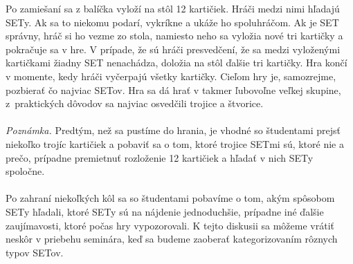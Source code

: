 \documentclass[11pt,a4paper,oneside,final]{book}
\begin{document}
Po zamiešaní sa z balíčka vyloží na stôl 12 kartičiek. Hráči medzi nimi hľadajú SETy. Ak sa to niekomu podarí, vykríkne  a ukáže ho spoluhráčom. Ak je SET správny, hráč si ho vezme zo stola, namiesto neho sa vyložia nové tri kartičky a pokračuje sa v hre. V prípade, že sú hráči presvedčení, že sa medzi vyloženými kartičkami žiadny SET nenachádza, doložia na stôl ďalšie tri kartičky. Hra končí v momente, kedy hráči vyčerpajú všetky kartičky. Cieľom hry je, samozrejme, pozbierať čo najviac SETov. Hra sa dá hrať v takmer ľubovoľne veľkej skupine, z~praktických dôvodov sa najviac osvedčili trojice a štvorice.\\
\\
\textit{Poznámka.} Predtým, než sa pustíme do hrania, je vhodné so študentami prejsť niekoľko trojíc kartičiek a pobaviť sa o tom, ktoré trojice SETmi sú, ktoré nie a prečo, prípadne premietnuť rozloženie 12 kartičiek a hľadať v nich SETy spoločne. \\
\\
Po zahraní niekoľkých kôl sa so študentami pobavíme o tom, akým spôsobom SETy hľadali, ktoré SETy sú na nájdenie jednoduchšie, prípadne iné ďalšie zaujímavosti, ktoré počas hry vypozorovali. K tejto diskusii sa môžeme vrátiť neskôr v priebehu seminára, keď sa budeme zaoberať kategorizovaním rôznych typov SETov.
\end{document}
